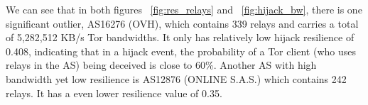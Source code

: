 We can see that in both figures ~\ref{fig:res_relays} and ~\ref{fig:hijack_bw}, there is one significant outlier, AS16276 (OVH), which contains 339 relays and carries a total of 5,282,512 KB/s Tor bandwidths. It only has relatively low hijack resilience of 0.408, indicating that in a hijack event, the probability of a Tor client (who uses relays in the AS) being deceived is close to 60\%. Another AS with high bandwidth yet low resilience is AS12876 (ONLINE S.A.S.) which contains 242 relays. It has a even lower resilience value of 0.35. \\




%

